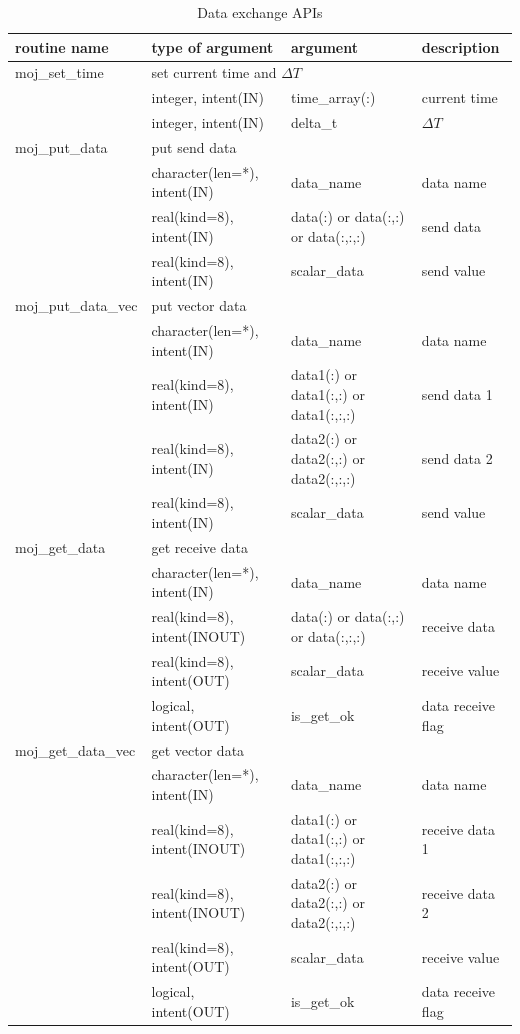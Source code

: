 \documentclass[11pt,a4paper]{report}
\begin{document}
\begin{table}[H]
\begin{center}
\caption{Data exchange APIs}
{\small
\label{table:moj_api_integration}
\begin{tabular}{llll}
\hline\hline
routine name & type of argument & argument　& description \\
\hline
 moj\_set\_time &  \multicolumn{3}{l}{set current time and $\Delta{T}$}\\
           &  integer, intent(IN) &  time\_array(:) & current time\\
           &  integer, intent(IN) &  delta\_t & $\Delta{T}$\\
\hline
 moj\_put\_data & \multicolumn{3}{l}{put send data} \\ 
                & character(len=*), intent(IN) & data\_name & data name\\
                & real(kind=8), intent(IN) & data(:) or data(:,:) or data(:,:,:) & send data\\
                & real(kind=8), intent(IN) & scalar\_data & send value \\
\hline
 moj\_put\_data\_vec & \multicolumn{3}{l}{put vector data} \\ 
                & character(len=*), intent(IN) & data\_name & data name\\
                & real(kind=8), intent(IN) & data1(:) or data1(:,:) or data1(:,:,:) & send data 1\\
                & real(kind=8), intent(IN) & data2(:) or data2(:,:) or data2(:,:,:) & send data 2\\
                & real(kind=8), intent(IN) & scalar\_data & send value \\
\hline
 moj\_get\_data & \multicolumn{3}{l}{get receive data} \\ 
                & character(len=*), intent(IN) & data\_name & data name\\
                & real(kind=8), intent(INOUT) & data(:) or data(:,:) or data(:,:,:) & receive data\\
                & real(kind=8), intent(OUT) & scalar\_data & receive value \\
                & logical, intent(OUT)        & is\_get\_ok & data receive flag\\
\hline
 moj\_get\_data\_vec & \multicolumn{3}{l}{get vector data} \\ 
                & character(len=*), intent(IN) & data\_name & data name\\
                & real(kind=8), intent(INOUT) & data1(:) or data1(:,:) or data1(:,:,:) & receive data 1\\
                & real(kind=8), intent(INOUT) & data2(:) or data2(:,:) or data2(:,:,:) & receive data 2\\
                & real(kind=8), intent(OUT) & scalar\_data & receive value\\
                & logical, intent(OUT)        & is\_get\_ok & data receive flag\\
\hline\hline
\end{tabular}
}
\end{center}
\end{table}
\end{document}
